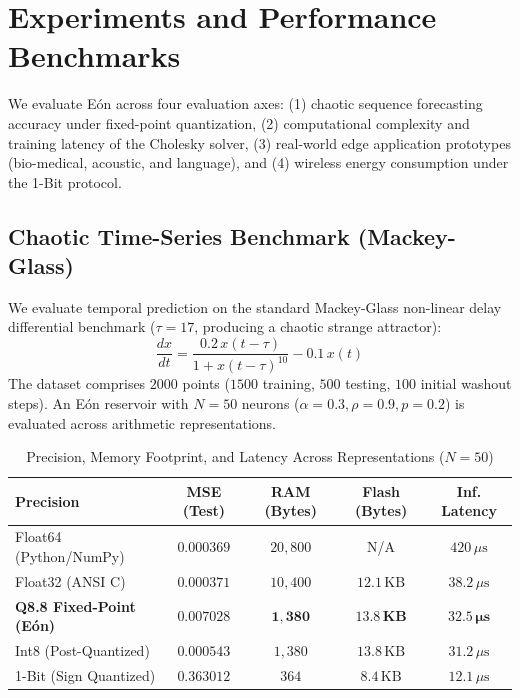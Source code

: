\section{Experiments and Performance Benchmarks}

We evaluate Eón across four evaluation axes: (1) chaotic sequence forecasting accuracy under fixed-point quantization, (2) computational complexity and training latency of the Cholesky solver, (3) real-world edge application prototypes (bio-medical, acoustic, and language), and (4) wireless energy consumption under the 1-Bit protocol.

\subsection{Chaotic Time-Series Benchmark (Mackey-Glass)}
We evaluate temporal prediction on the standard Mackey-Glass non-linear delay differential benchmark ($\tau=17$, producing a chaotic strange attractor):
\begin{equation}
    \frac{dx}{dt} = \frac{0.2 \, x(t - \tau)}{1 + x(t - \tau)^{10}} - 0.1 \, x(t)
\end{equation}
The dataset comprises $2000$ points ($1500$ training, $500$ testing, $100$ initial washout steps). An Eón reservoir with $N=50$ neurons ($\alpha=0.3, \rho=0.9, p=0.2$) is evaluated across arithmetic representations.

\begin{table}[h]
\centering
\caption{Precision, Memory Footprint, and Latency Across Representations ($N=50$)}
\label{tab:precision_benchmark}
\begin{tabular}{lcccc}
\toprule
\textbf{Precision} & \textbf{MSE (Test)} & \textbf{RAM (Bytes)} & \textbf{Flash (Bytes)} & \textbf{Inf. Latency} \\
\midrule
Float64 (Python/NumPy) & $0.000369$ & $20,800$ & N/A & $420\,\mu\text{s}$ \\
Float32 (ANSI C)       & $0.000371$ & $10,400$ & $12.1\,\text{KB}$ & $38.2\,\mu\text{s}$ \\
\textbf{Q8.8 Fixed-Point (Eón)} & $\mathbf{0.007028}$ & $\mathbf{1,380}$ & $\mathbf{13.8\,\text{KB}}$ & $\mathbf{32.5\,\mu\text{s}}$ \\
Int8 (Post-Quantized)  & $0.000543$ & $1,380$ & $13.8\,\text{KB}$ & $31.2\,\mu\text{s}$ \\
1-Bit (Sign Quantized) & $0.363012$ & $364$ & $8.4\,\text{KB}$ & $12.1\,\mu\text{s}$ \\
\bottomrule
\end{tabular}
\end{table}

